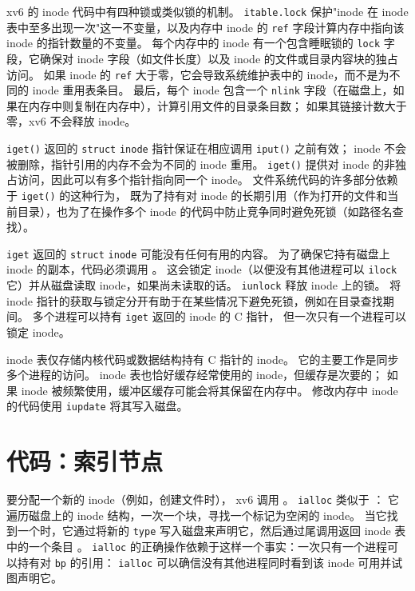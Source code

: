 xv6 的 inode 代码中有四种锁或类似锁的机制。
\lstinline{itable.lock}
保护"inode 在 inode 表中至多出现一次"这一不变量，以及内存中 inode 的
\lstinline{ref}
字段计算内存中指向该 inode 的指针数量的不变量。
每个内存中的 inode 有一个包含睡眠锁的
\lstinline{lock}
字段，它确保对 inode 字段（如文件长度）以及 inode 的文件或目录内容块的独占访问。
如果 inode 的
\lstinline{ref}
大于零，它会导致系统维护表中的 inode，而不是为不同的 inode 重用表条目。
最后，每个 inode 包含一个
\lstinline{nlink}
字段（在磁盘上，如果在内存中则复制在内存中），计算引用文件的目录条目数；
如果其链接计数大于零，xv6 不会释放 inode。

\lstinline{iget()}
返回的
\lstinline{struct}
\lstinline{inode}
指针保证在相应调用
\lstinline{iput()}
之前有效；
inode 不会被删除，指针引用的内存不会为不同的 inode 重用。
\lstinline{iget()}
提供对 inode 的非独占访问，因此可以有多个指针指向同一个 inode。
文件系统代码的许多部分依赖于
\lstinline{iget()}
的这种行为，
既为了持有对 inode 的长期引用（作为打开的文件和当前目录），也为了在操作多个 inode 的代码中防止竞争同时避免死锁（如路径名查找）。

\lstinline{iget}
返回的
\lstinline{struct}
\lstinline{inode}
可能没有任何有用的内容。
为了确保它持有磁盘上 inode 的副本，代码必须调用
。
这会锁定 inode（以便没有其他进程可以
\lstinline{ilock}
它）并从磁盘读取 inode，如果尚未读取的话。
\lstinline{iunlock}
释放 inode 上的锁。
将 inode 指针的获取与锁定分开有助于在某些情况下避免死锁，例如在目录查找期间。
多个进程可以持有
\lstinline{iget}
返回的 inode 的 C 指针，
但一次只有一个进程可以锁定 inode。

inode 表仅存储内核代码或数据结构持有 C 指针的 inode。
它的主要工作是同步多个进程的访问。
inode 表也恰好缓存经常使用的 inode，但缓存是次要的；
如果 inode 被频繁使用，缓冲区缓存可能会将其保留在内存中。
修改内存中 inode 的代码使用
\lstinline{iupdate}
将其写入磁盘。
\section{代码：索引节点}

要分配一个新的 inode（例如，创建文件时），
xv6 调用
。
\lstinline{ialloc}
类似于
：
它遍历磁盘上的 inode 结构，一次一个块，寻找一个标记为空闲的 inode。
当它找到一个时，它通过将新的
\lstinline{type}
写入磁盘来声明它，然后通过尾调用返回 inode 表中的一个条目
。
\lstinline{ialloc}
的正确操作依赖于这样一个事实：一次只有一个进程可以持有对
\lstinline{bp}
的引用：
\lstinline{ialloc}
可以确信没有其他进程同时看到该 inode 可用并试图声明它。

